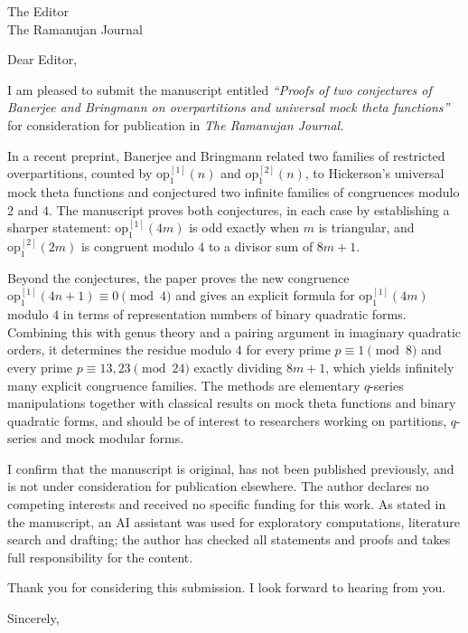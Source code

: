 \documentclass[11pt]{letter}
\date{\today}
\begin{document}
\begin{letter}{The Editor\\ The Ramanujan Journal}

\opening{Dear Editor,}

I am pleased to submit the manuscript entitled \emph{``Proofs of two conjectures of Banerjee and Bringmann on overpartitions and universal mock theta functions''} for consideration for publication in \emph{The Ramanujan Journal}.

In a recent preprint, Banerjee and Bringmann related two families of restricted overpartitions, counted by $\mathrm{op}_1^{[1]}(n)$ and $\mathrm{op}_1^{[2]}(n)$, to Hickerson's universal mock theta functions and conjectured two infinite families of congruences modulo $2$ and $4$. The manuscript proves both conjectures, in each case by establishing a sharper statement: $\mathrm{op}_1^{[1]}(4m)$ is odd exactly when $m$ is triangular, and $\mathrm{op}_1^{[2]}(2m)$ is congruent modulo $4$ to a divisor sum of $8m+1$.

Beyond the conjectures, the paper proves the new congruence $\mathrm{op}_1^{[1]}(4n+1)\equiv0\pmod 4$ and gives an explicit formula for $\mathrm{op}_1^{[1]}(4m)$ modulo $4$ in terms of representation numbers of binary quadratic forms. Combining this with genus theory and a pairing argument in imaginary quadratic orders, it determines the residue modulo $4$ for every prime $p\equiv1\pmod 8$ and every prime $p\equiv13,23\pmod{24}$ exactly dividing $8m+1$, which yields infinitely many explicit congruence families. The methods are elementary $q$-series manipulations together with classical results on mock theta functions and binary quadratic forms, and should be of interest to researchers working on partitions, $q$-series and mock modular forms.

I confirm that the manuscript is original, has not been published previously, and is not under consideration for publication elsewhere. The author declares no competing interests and received no specific funding for this work. As stated in the manuscript, an AI assistant was used for exploratory computations, literature search and drafting; the author has checked all statements and proofs and takes full responsibility for the content.

Thank you for considering this submission. I look forward to hearing from you.

\closing{Sincerely,}

\end{letter}
\end{document}
